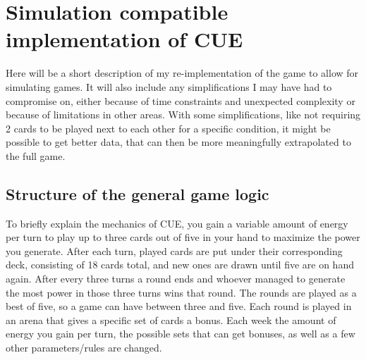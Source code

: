 \section{Simulation compatible implementation of CUE}
\label{sec:method:game}
Here will be a short description of my re-implementation of the game to allow for simulating games. It will also include any simplifications I may have had to compromise on, either because of time constraints and unexpected complexity or because of limitations in other areas. With some simplifications, like not requiring 2 cards to be played next to each other for a specific condition, it might be possible to get better data, that can then be more meaningfully extrapolated to the full game.\\

\subsection{Structure of the general game logic}
\label{sec:method:game:general}
To briefly explain the mechanics of CUE, you gain a variable amount of energy per turn to play up to three cards out of five in your hand to maximize the power you generate. After each turn, played cards are put under their corresponding deck, consisting of 18 cards total, and new ones are drawn until five are on hand again. After every three turns a round ends and whoever managed to generate the most power in those three turns wins that round. The rounds are played as a best of five, so a game can have between three and five. Each round is played in an arena that gives a specific set of cards a bonus. Each week the amount of energy you gain per turn, the possible sets that can get bonuses, as well as a few other parameters/rules are changed.

